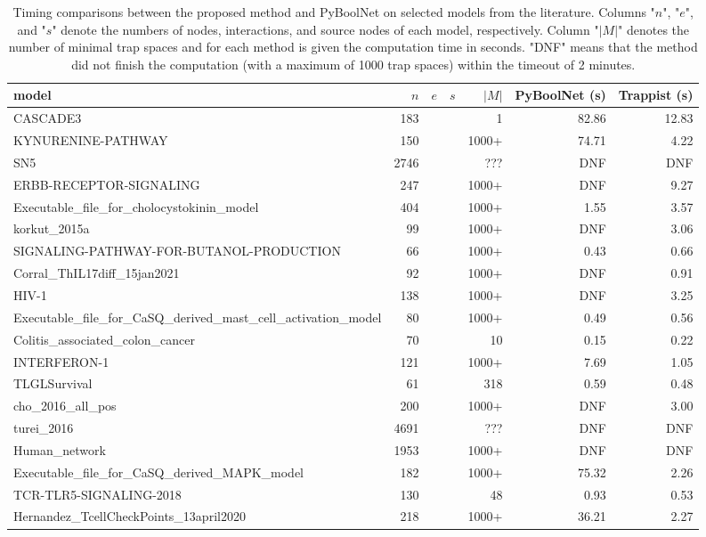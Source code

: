 \documentclass[runningheads]{llncs}
\begin{document}
\begin{table}[!htb]
  \caption{Timing comparisons between the proposed method and PyBoolNet on selected models from the literature.
    Columns "\(n\)", "\(e\)", and "\(s\)" denote the numbers of nodes, interactions, and source nodes of each model, respectively. Column "\(|M|\)" denotes the number of minimal trap spaces and for each method is given the computation time in seconds.
    "DNF" means that the method did not finish the computation (with a maximum of 1000 trap spaces) within the timeout of 2 minutes.}
  \centering
  \label{tab:selected_redone}
  \begin{tabular}{lrrrrrr}
    \toprule
    model & $n$ & $e$ & $s$ & $|M|$ & PyBoolNet (s) & Trappist (s) \\ \midrule
    CASCADE3 & 183 &&& 1 & 82.86 & 12.83\\
    KYNURENINE-PATHWAY & 150 &&& 1000+ & 74.71 & 4.22\\
    SN5 & 2746 &&& ??? & DNF & DNF\\
    ERBB-RECEPTOR-SIGNALING & 247 &&& 1000+ & DNF & 9.27\\
    Executable\_file\_for\_cholocystokinin\_model & 404 &&& 1000+ & 1.55 & 3.57\\
    korkut\_2015a & 99 &&& 1000+ & DNF & 3.06\\
    SIGNALING-PATHWAY-FOR-BUTANOL-PRODUCTION & 66 &&& 1000+ & 0.43 & 0.66\\
    Corral\_ThIL17diff\_15jan2021 & 92 &&& 1000+ & DNF & 0.91\\
    HIV-1 & 138 &&& 1000+ & DNF & 3.25\\
    Executable\_file\_for\_CaSQ\_derived\_mast\_cell\_activation\_model & 80 &&& 1000+ & 0.49 & 0.56\\
    Colitis\_associated\_colon\_cancer & 70 &&& 10 & 0.15 & 0.22\\
    INTERFERON-1 & 121 &&& 1000+ & 7.69 & 1.05\\
    TLGLSurvival & 61 &&& 318 & 0.59 & 0.48\\
    cho\_2016\_all\_pos & 200 &&& 1000+ & DNF & 3.00\\
    turei\_2016 & 4691 &&& ??? & DNF & DNF\\
    Human\_network & 1953 &&& 1000+ & DNF & DNF\\
    Executable\_file\_for\_CaSQ\_derived\_MAPK\_model & 182 &&& 1000+ & 75.32 & 2.26\\
    TCR-TLR5-SIGNALING-2018 & 130 &&& 48 & 0.93 & 0.53\\
    Hernandez\_TcellCheckPoints\_13april2020 & 218 &&& 1000+ & 36.21 & 2.27\\

\end{tabular}
\end{table}
\end{document}
